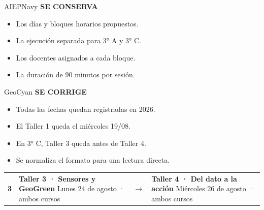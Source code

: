 \documentclass[9pt,a4paper]{article}
\begin{document}
\vspace{1mm}
\begin{minipage}[t]{0.487\textwidth}
\begin{cleanbox}[height=38mm]{AIEPNavy}
{\scriptsize\bfseries\color{AIEPNavy}SE CONSERVA}
\begin{itemize}
  \item Los días y bloques horarios propuestos.
  \item La ejecución separada para 3° A y 3° C.
  \item Los docentes asignados a cada bloque.
  \item La duración de 90 minutos por sesión.
\end{itemize}
\end{cleanbox}
\end{minipage}\hfill
\begin{minipage}[t]{0.487\textwidth}
\begin{cleanbox}[height=38mm]{GeoCyan}
{\scriptsize\bfseries\color{GeoCyan}SE CORRIGE}
\begin{itemize}
  \item Todas las fechas quedan registradas en 2026.
  \item El Taller 1 queda el miércoles 19/08.
  \item En 3° C, Taller 3 queda antes de Taller 4.
  \item Se normaliza el formato para una lectura directa.
\end{itemize}
\end{cleanbox}
\end{minipage}

\vspace{2mm}
\begin{tcolorbox}[
  colback=GeoCyanSoft,
  colframe=GeoCyan,
  boxrule=0.55pt,
  arc=1mm,
  left=3mm,right=3mm,top=2mm,bottom=2mm]
\begin{tabularx}{\textwidth}{@{}C{8mm}Y C{10mm} Y@{}}
{\large\bfseries\color{GeoCyan}3} &
{\bfseries\color{AIEPNavy}Taller 3 · Sensores y GeoGreen}\newline
{\small\color{AIEPMuted}Lunes 24 de agosto · ambos cursos}
& {\Large\bfseries\color{GeoCyan}$\longrightarrow$} &
{\bfseries\color{AIEPNavy}Taller 4 · Del dato a la acción}\newline
{\small\color{AIEPMuted}Miércoles 26 de agosto · ambos cursos}
\end{tabularx}
\end{tcolorbox}
\end{document}
